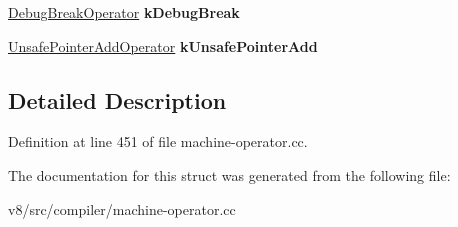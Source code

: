 \begin{DoxyCompactItemize}
\mbox{\hyperlink{structv8_1_1internal_1_1compiler_1_1MachineOperatorGlobalCache_1_1DebugBreakOperator}{Debug\+Break\+Operator}} {\bfseries k\+Debug\+Break}
\item 
\mbox{\label{structv8_1_1internal_1_1compiler_1_1MachineOperatorGlobalCache_aba8ee12c2d595826f28287b2820c62b4}} 
\mbox{\hyperlink{structv8_1_1internal_1_1compiler_1_1MachineOperatorGlobalCache_1_1UnsafePointerAddOperator}{Unsafe\+Pointer\+Add\+Operator}} {\bfseries k\+Unsafe\+Pointer\+Add}
\end{DoxyCompactItemize}


\subsection{Detailed Description}


Definition at line 451 of file machine-\/operator.\+cc.



The documentation for this struct was generated from the following file\+:\begin{DoxyCompactItemize}
\item 
v8/src/compiler/machine-\/operator.\+cc\end{DoxyCompactItemize}
